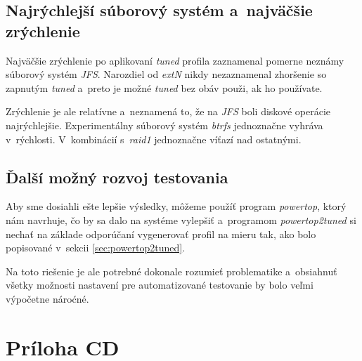 \section{Najrýchlejší súborový systém a~najväčšie zrýchlenie}

Najväčšie zrýchlenie po aplikovaní \emph{tuned} profila zaznamenal pomerne
neznámy súborový systém \emph{JFS}. Narozdiel od \emph{extN} nikdy nezaznamenal
zhoršenie so zapnutým \emph{tuned} a~preto je možné \emph{tuned} bez obáv
použi, ak ho používate.

Zrýchlenie je ale relatívne a~neznamená to, že na \emph{JFS} boli diskové
operácie najrýchlejšie. Experimentálny súborový systém \emph{btrfs} jednoznačne
vyhráva v~rýchlosti. V~kombinácií s~\emph{raid1} jednoznačne víťazí nad
ostatnými.

\section{Ďalší možný rozvoj testovania}

Aby sme dosiahli ešte lepšie výsledky, môžeme použíť program \emph{powertop},
ktorý nám navrhuje, čo by sa dalo na systéme vylepšiť a~programom
\emph{powertop2tuned} si nechať na základe odporúčaní vygenerovať profil na
mieru tak, ako bolo popisované v~sekcii \ref{sec:powertop2tuned}.

Na toto riešenie je ale potrebné dokonale rozumieť problematike a~obsiahnuť
všetky možnosti nastavení pre automatizované testovanie by bolo veľmi výpočetne
nároćné.

%
%

\setcounter{chapter}{0}
\renewcommand{\thechapter}{\Alph{chapter}}
\chapter{Príloha CD}

